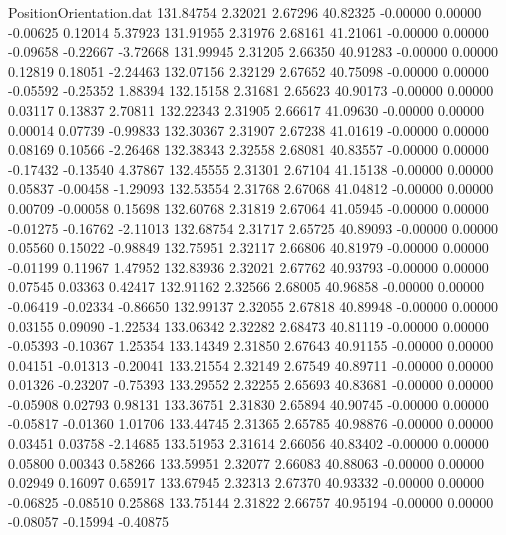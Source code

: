 \begin{filecontents}{PositionOrientation.dat}
 131.84754    2.32021    2.67296    40.82325   -0.00000    0.00000   -0.00625    0.12014    5.37923
 131.91955    2.31976    2.68161    41.21061   -0.00000    0.00000   -0.09658   -0.22667   -3.72668
 131.99945    2.31205    2.66350    40.91283   -0.00000    0.00000    0.12819    0.18051   -2.24463
 132.07156    2.32129    2.67652    40.75098   -0.00000    0.00000   -0.05592   -0.25352    1.88394
 132.15158    2.31681    2.65623    40.90173   -0.00000    0.00000    0.03117    0.13837    2.70811
 132.22343    2.31905    2.66617    41.09630   -0.00000    0.00000    0.00014    0.07739   -0.99833
 132.30367    2.31907    2.67238    41.01619   -0.00000    0.00000    0.08169    0.10566   -2.26468
 132.38343    2.32558    2.68081    40.83557   -0.00000    0.00000   -0.17432   -0.13540    4.37867
 132.45555    2.31301    2.67104    41.15138   -0.00000    0.00000    0.05837   -0.00458   -1.29093
 132.53554    2.31768    2.67068    41.04812   -0.00000    0.00000    0.00709   -0.00058    0.15698
 132.60768    2.31819    2.67064    41.05945   -0.00000    0.00000   -0.01275   -0.16762   -2.11013
 132.68754    2.31717    2.65725    40.89093   -0.00000    0.00000    0.05560    0.15022   -0.98849
 132.75951    2.32117    2.66806    40.81979   -0.00000    0.00000   -0.01199    0.11967    1.47952
 132.83936    2.32021    2.67762    40.93793   -0.00000    0.00000    0.07545    0.03363    0.42417
 132.91162    2.32566    2.68005    40.96858   -0.00000    0.00000   -0.06419   -0.02334   -0.86650
 132.99137    2.32055    2.67818    40.89948   -0.00000    0.00000    0.03155    0.09090   -1.22534
 133.06342    2.32282    2.68473    40.81119   -0.00000    0.00000   -0.05393   -0.10367    1.25354
 133.14349    2.31850    2.67643    40.91155   -0.00000    0.00000    0.04151   -0.01313   -0.20041
 133.21554    2.32149    2.67549    40.89711   -0.00000    0.00000    0.01326   -0.23207   -0.75393
 133.29552    2.32255    2.65693    40.83681   -0.00000    0.00000   -0.05908    0.02793    0.98131
 133.36751    2.31830    2.65894    40.90745   -0.00000    0.00000   -0.05817   -0.01360    1.01706
 133.44745    2.31365    2.65785    40.98876   -0.00000    0.00000    0.03451    0.03758   -2.14685
 133.51953    2.31614    2.66056    40.83402   -0.00000    0.00000    0.05800    0.00343    0.58266
 133.59951    2.32077    2.66083    40.88063   -0.00000    0.00000    0.02949    0.16097    0.65917
 133.67945    2.32313    2.67370    40.93332   -0.00000    0.00000   -0.06825   -0.08510    0.25868
 133.75144    2.31822    2.66757    40.95194   -0.00000    0.00000   -0.08057   -0.15994   -0.40875

\end{filecontents}

